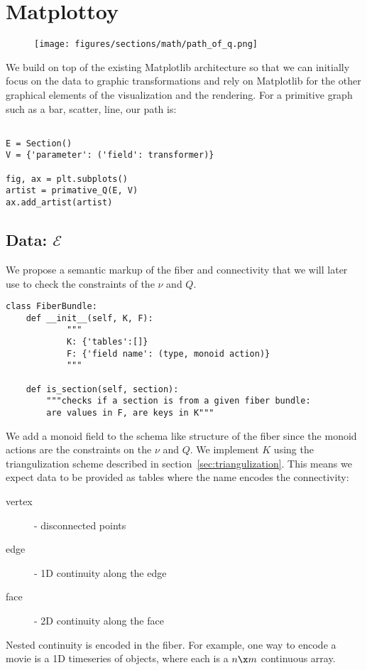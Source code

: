 \documentclass[../main.tex]{subfiles}
\begin{document}
\section{Matplottoy}
\begin{figure}
\texttt{[image: figures/sections/math/path\_of\_q.png]}
\end{figure}

We build on top of the existing Matplotlib architecture \cite{hunterMatplotlib2DGraphics2007} so that we can initially focus on the data to graphic transformations and rely on Matplotlib for the other graphical elements of the visualization and the rendering. For a primitive graph such as a bar, scatter, line, our path is: 
\begin{verbatim}

E = Section()
V = {'parameter': ('field': transformer)}

fig, ax = plt.subplots()
artist = primative_Q(E, V)
ax.add_artist(artist)
\end{verbatim}



\subsection{Data: $\mathcal{E}$}
We propose a semantic markup of the fiber and connectivity that we will later use to check the constraints of the $\nu$ and $Q$. 
\begin{verbatim}
class FiberBundle:
    def __init__(self, K, F):
            """
            K: {'tables':[]}
            F: {'field name': (type, monoid action)}
            """

    def is_section(self, section):
        """checks if a section is from a given fiber bundle:
        are values in F, are keys in K"""
\end{verbatim}
We add a monoid field to the schema like structure of the fiber since the monoid actions are the constraints on the $\nu$ and $Q$. We implement $K$ using the triangulization scheme described in section~\ref{sec:triangulization}. This means we expect data to be provided as tables where the name encodes the connectivity:

\begin{description}
    \item[vertex] - disconnected points
    \item[edge] - 1D continuity along the edge
    \item[face] - 2D continuity along the face
\end{description}
Nested continuity is encoded in the fiber. For example, one way to encode a movie is a 1D timeseries of  objects, where each  is a $n\x m$ continuous array. 
\end{document}
